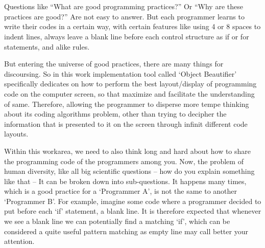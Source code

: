 

%
\cleardoublepage
{}


\chapter{}


\chooselang
{
    Questions like ``What are good programming practices?'' Or ``Why are these practices are good?''
    Are not easy to answer. But each programmer learns to write their codes in a certain way, with
    certain features like using 4 or 8 spaces to indent lines, always leave a blank line before each
    control structure as if or for statements, and alike rules.

    But entering the universe of good practices, there are many things for discoursing. So in this
    work implementation tool called `Object Beautifier' specifically dedicates on how to perform
    the best layout/display of programming code on the computer screen, so that maximize and
    facilitate the understanding of same. Therefore, allowing the programmer to disperse more tempe
    thinking about its coding algorithms problem, other than trying to decipher the information that
    is presented to it on the screen through infinit different code layouts.

    Within this work\s area, we need to also think long and hard about how to share the programming
    code of the programmers among you. Now, the problem of human diversity, like all big scientific
    questions -- how do you explain something like that -- It can be broken down into sub-questions.
    It happens many times, which is a good practice for a `Programmer A', is not the same to another
    `Programmer B'. For example, imagine some code where a programmer decided to put before each
    `if' statement, a blank line. It is therefore expected that whenever we see a blank line we can
    potentially find a matching `if', which can be considered a quite useful pattern matching as
    empty line may call better your attention.

}
